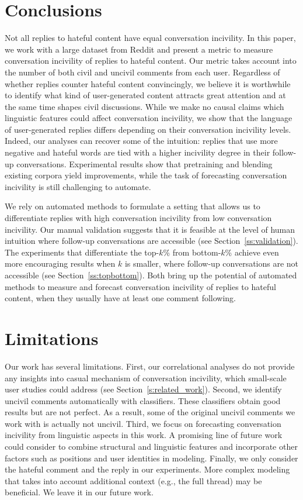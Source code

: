 \documentclass[11pt]{article}
\begin{document}
	\section{Conclusions}
	Not all replies to hateful content have equal conversation incivility.
	In this paper, we work with a large dataset from Reddit and present a metric to measure conversation incivility of replies to hateful content.
	Our metric takes account into the number of both civil and uncivil comments from each user.
	Regardless of whether replies counter hateful content convincingly,
	we believe it is worthwhile to identify what kind of user-generated content attracts great attention and at the same time shapes civil discussions.
	While we make no causal claims which linguistic features could affect conversation incivility, 
	we show that the language of user-generated replies differs depending on their conversation incivility levels.
	Indeed, our analyses can recover some of the intuition: replies that use more negative and hateful words are tied with a higher incivility degree in their follow-up conversations.
	Experimental results show that pretraining and blending existing corpora yield improvements, while the task of forecasting conversation incivility is still challenging to automate.
	
	We rely on automated methods to formulate a setting that allows us to differentiate replies with high conversation incivility from low conversation incivility. 
	Our manual validation suggests that it is feasible at the level of human intuition where follow-up conversations are accessible (see Section~\ref{ss:validation}).
	The experiments that differentiate the top-$k$\% from bottom-$k$\% achieve even more encouraging results when $k$ is smaller, where follow-up conversations are not accessible (see Section~\ref{ss:topbottom}).
	Both bring up the potential of automated methods to measure and forecast conversation incivility of replies to hateful content, when they usually have at least one comment following.
	
	
	
	\section*{Limitations}
	Our work has several limitations. 
	First, our correlational analyses do not provide any insights into casual mechanism of conversation incivility, which small-scale user studies could address (see Section~\ref{s:related_work}).
	Second, we identify uncivil comments automatically with classifiers.
	These classifiers obtain good results but are not perfect.
	As a result,
	some of the original uncivil comments we work with is actually not uncivil.
	Third, we focus on forecasting conversation incivility from linguistic aspects in this work. 
	A promising line of future work could consider to combine structural and linguistic features and incorporate other factors such as positions and user identities in modeling.
	Finally, we only consider the hateful comment and the reply in our experiments.
	More complex modeling that takes into account additional context (e.g., the full thread) may be beneficial.
	We leave it in our future work.
	
\end{document}

